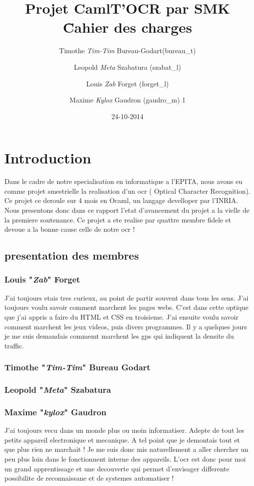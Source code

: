 \documentclass{article}
\title{Projet CamlT'OCR par SMK \~Cahier des charges}
\date{24-10-2014}
\author{
    Timothe \textit{Tim-Tim} Bureau-Godart(bureau\_t) \and
        Leopold \textit{Meta} Szabatura (szabat\_l) \and
        Louis \textit{Zab} Forget (forget\_l) \and
        Maxime \textit{Kylox} Gaudron (gaudro\_m)
        1      }
\begin{document}
\begin{center}
\maketitle
\end{center}
\newpage
\tableofcontents
\newpage
\section{Introduction}
Dans le cadre de notre specialisation en informatique a l'EPITA, nous avons eu comme projet smestrielle la realisation d'un ocr ( Optical Character Recognition). Ce projet ce deroule sur 4 mois en Ocaml, un langage develloper par l'INRIA. Nous presentons donc dans ce rapport l'etat d'avancement du projet a la vielle de la premiere soutenance. Ce projet a ete realise par quattre membre fidele et devoue a la bonne cause celle de notre ocr ! 
\subsection{presentation des membres}
\subsubsection{Louis "\textit{Zab}" Forget}
J'ai toujours etais tres curieux, au point de partir souvent dans tous les sens. J'ai toujours voulu savoir comment marchent les pages webs. C'est dans cette optique que j'ai appris a faire du HTML et CSS en troisieme. J'ai ensuite voulu savoir comment marchent les jeux videos, puis divers programmes. Il y a quelques jours je me suis demandais commemt marchent les gps qui indiquent la densite du traffic.
\subsubsection{Timothe "\textit{Tim-Tim}" Bureau Godart}
\subsubsection{Leopold "\textit{Meta}" Szabatura}
\subsubsection{Maxime "\textit{kylox}" Gaudron}
J'ai toujours vecu dans un monde plus ou moin informatiser. Adepte de tout les petits appareil electronique et mecanique. A tel point que je demontais tout et que plus rien ne marchait ! Je me suis donc mis naturellement a aller chercher un peu plus loin dans le fonctionnent interne des appareils. L'ocr est donc pour moi un grand apprentissage et une decouverte qui permet d'envisager differente possibilite de reconnaissane et de systemes automatiser ! 
\end{document}
